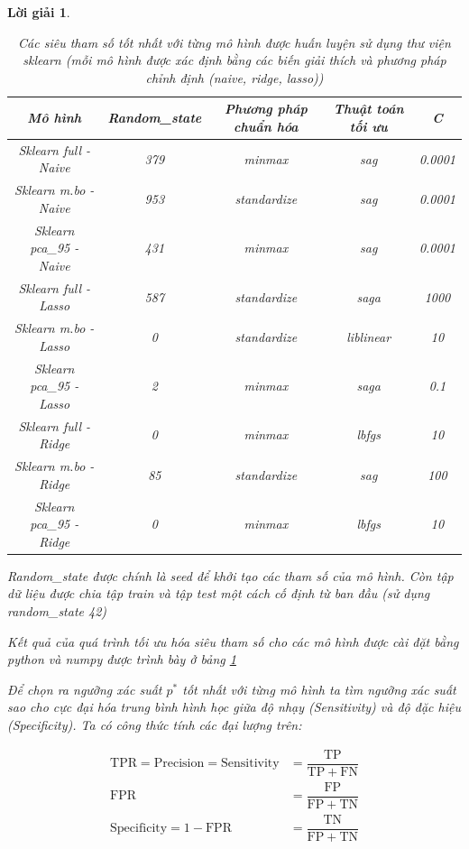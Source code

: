 \documentclass[14pt, a4paper]{article}
\theoremstyle{sltheorem}
\theoremstyle{soltheorem}
\newtheorem*{loigiai}{Lời giải}
\begin{document}
\begin{loigiai}
    \begin{table}[h!]
        \centering
        \begin{tabular}{|c | c | c | c | c |}
            \hline
            Mô hình & Random\_state & Phương pháp chuẩn hóa & Thuật toán tối ưu & C \\
            \hline
            \hline
            Sklearn full - Naive & 379 & minmax & sag & 0.0001 \\
            \hline
            Sklearn m.bo - Naive & 953 & standardize & sag & 0.0001 \\
            \hline
            Sklearn pca\_95 - Naive & 431 & minmax & sag & 0.0001 \\
            \hline
            Sklearn full - Lasso & 587 & standardize & saga & 1000 \\
            \hline
            Sklearn m.bo - Lasso & 0 & standardize & liblinear & 10 \\
            \hline
            Sklearn pca\_95 - Lasso & 2 & minmax & saga & 0.1 \\
            \hline
            Sklearn full - Ridge & 0 & minmax & lbfgs & 10 \\
            \hline
            Sklearn m.bo - Ridge & 85 & standardize & sag & 100 \\
            \hline
            Sklearn pca\_95 - Ridge & 0 & minmax & lbfgs & 10 \\
            \hline
        \end{tabular}
        \caption{Các siêu tham số tốt nhất với từng mô hình được huấn luyện sử dụng thư viện sklearn (mỗi mô hình được xác định bằng các biến giải thích và phương pháp chỉnh định (naive, ridge, lasso))}
        \label{tab:sklearn-hyperparameter-result}
    \end{table}

    Random\_state được chính là seed để khởi tạo các tham số của mô hình.
    Còn tập dữ liệu được chia tập train và tập test một cách cố định từ ban đầu (sử dụng random\_state 42)

    Kết quả của quá trình tối ưu hóa siêu tham số cho các mô hình được cài đặt bằng python và numpy được trình bày ở bảng \ref{tab:sklearn-hyperparameter-result}


    Để chọn ra ngưỡng xác suất $p^*$ tốt nhất với từng mô hình ta tìm ngưỡng xác suất sao cho cực đại hóa trung bình hình học giữa độ nhạy (Sensitivity) và độ đặc hiệu (Specificity).
    Ta có công thức tính các đại lượng trên:

    \begin{equation*}
        \begin{aligned}
            \mathrm{TPR} = \mathrm{Precision} = \mathrm{Sensitivity} &= \dfrac{\mathrm{TP}}{\mathrm{TP} + \mathrm{FN}} \\
            \mathrm{FPR} &= \dfrac{\mathrm{FP}}{\mathrm{FP} + \mathrm{TN}} \\
            \mathrm{Specificity} = 1 - \mathrm{FPR} &= \dfrac{\mathrm{TN}}{\mathrm{FP} + \mathrm{TN}}
        \end{aligned}
    \end{equation*}


\end{loigiai}
\end{document}
